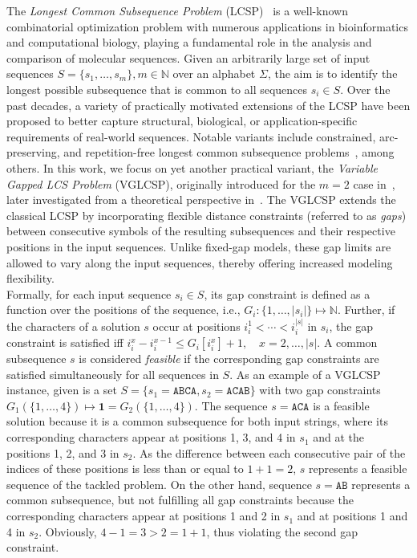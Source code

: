 \documentclass[runningheads]{llncs}
\begin{document}
The \textit{Longest Common Subsequence Problem} (LCSP)~\cite{DJUKANOVIC2020106499,bergroth2000survey} is a well-known combinatorial optimization problem with numerous applications in bioinformatics and computational biology, playing a fundamental role in the analysis and comparison of molecular sequences. Given an arbitrarily large set of input sequences $
S=\{s_1,\ldots,s_m\}, m \in \mathbb{N}$  over an alphabet $\Sigma$, the aim is to identify the longest possible subsequence that is common to all sequences $s_i \in S$. Over the past decades, a variety of practically motivated extensions of the LCSP have been proposed to better capture structural, biological, or application-specific requirements of real-world sequences. Notable variants include constrained, arc-preserving, and repetition-free longest common subsequence problems~\cite{jiang2004longest,farhana2015constrained,adi2010repetition}, among others. In this work, we focus on yet another practical variant, the \textit{Variable Gapped LCS Problem} (VGLCSP),  originally introduced for the $m=2$ case in~\cite{penga2011longest}, later investigated from a theoretical perspective in~\cite{adamson2023longest}. The VGLCSP extends the classical LCSP by incorporating flexible distance constraints (referred to as \emph{gaps}) between consecutive symbols of the resulting subsequences and their respective positions in the input sequences. Unlike fixed-gap models, these gap limits are allowed to vary along the input sequences, thereby offering increased modeling flexibility.\\
Formally, for each input sequence $s_i \in S$, its gap constraint is defined as a function over the  positions of the sequence, i.e., $
G_i \colon \{1,\ldots,|s_i|\} \mapsto \mathbb{N}.$ Further, if the characters of a solution $s$ occur at positions
$i^1_i < \cdots < i^{|s|}_i$ in $s_i$, the gap constraint is satisfied iff $
i^x_i - i^{x-1}_i \leq G_i[i^x_i] + 1, \quad x = 2,\ldots,|s|.$ A common subsequence $s$ is considered \emph{feasible} if the corresponding gap constraints are satisfied simultaneously for all sequences in $S$. As an example of a VGLCSP instance, given is a set  $S=\{s_1=\texttt{ABCA},   s_2=\texttt{ACAB} \}$ with two gap constraints $G_1(\{1,\ldots, 4\}) \mapsto \textbf{1}= G_2(\{1, \ldots, 4\})$. The sequence $s=\texttt{ACA}$ is a feasible solution because it is a common subsequence for both input strings, where its corresponding characters appear at positions 1, 3, and 4 in $s_1$ and at the positions 1, 2, and 3 in $s_2$. As the difference between each consecutive pair of the indices of these positions is less than or equal to $1+1=2$, $s$ represents a feasible sequence of the tackled problem.  On the other hand, sequence $s=\texttt{AB}$ represents a common subsequence, but not fulfilling all gap constraints because the corresponding characters appear at positions 1 and 2 in $s_1$ and at positions 1 and 4 in $s_2$. Obviously, $4-1=3>2=1+1$, thus violating the second gap constraint. \\ 
\end{document}
